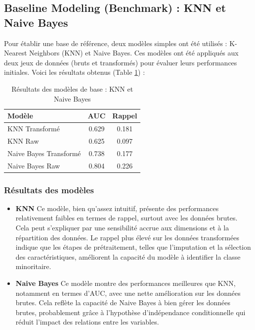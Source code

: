 \documentclass[a4paper,12pt]{report}
\begin{document}
\subsection{Baseline Modeling (Benchmark) : KNN et Naive Bayes}

Pour établir une base de référence, deux modèles simples ont été utilisés : K-Nearest Neighbors (KNN) et Naive Bayes. Ces modèles ont été appliqués aux deux jeux de données (bruts et transformés) pour évaluer leurs performances initiales. Voici les résultats obtenus (Table \ref{table:benchmark_model}) :

\begin{table}[h!]
  \centering
  \begin{tabular}{|l|c|c|}
    \hline
    \textbf{Modèle} & \textbf{AUC} & \textbf{Rappel} \\
    \hline
    KNN Transformé & 0.629 & 0.181 \\
    \hline
    KNN Raw & 0.625 & 0.097 \\
    \hline
    Naive Bayes Transformé & 0.738 & 0.177 \\
    \hline
    Naive Bayes Raw & 0.804 & 0.226 \\
    \hline
  \end{tabular}
  \caption{Résultats des modèles de base : KNN et Naive Bayes}
  \label{table:benchmark_model}
\end{table}

\subsubsection{Résultats des modèles}

\begin{itemize}
  \item{ \textbf{KNN} \newline
    Ce modèle, bien qu'assez intuitif, présente des performances relativement faibles en termes de rappel, surtout avec les données brutes. Cela peut s'expliquer par une sensibilité accrue aux dimensions et à la répartition des données. Le rappel plus élevé sur les données transformées indique que les étapes de prétraitement, telles que l'imputation et la sélection des caractéristiques, améliorent la capacité du modèle à identifier la classe minoritaire.
    }
  \item{ \textbf{Naive Bayes} \newline
    Ce modèle montre des performances meilleures que KNN, notamment en termes d'AUC, avec une nette amélioration sur les données brutes. Cela reflète la capacité de Naive Bayes à bien gérer les données brutes, probablement grâce à l'hypothèse d'indépendance conditionnelle qui réduit l'impact des relations entre les variables.
  }
\end{itemize}
\end{document}
